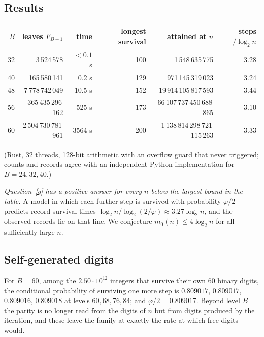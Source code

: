 \documentclass[11pt]{article}
\newcommand{\toprule}{\hline}\newcommand{\midrule}{\hline}\newcommand{\bottomrule}{\hline}
\begin{document}
\subsection*{Results}
\begin{center}
\begin{tabular}{rrrrrr}
\toprule
$B$ & leaves $F_{B+1}$ & time & longest survival & attained at $n$ & steps$/\log_2 n$\\
\midrule
32 & 3\,524\,578 & $<0.1$ s & 100 & 1\,548\,635\,775 & 3.28\\
40 & 165\,580\,141 & 0.2 s & 129 & 971\,145\,319\,023 & 3.24\\
48 & 7\,778\,742\,049 & 10.5 s & 152 & 19\,914\,105\,817\,593 & 3.44\\
56 & 365\,435\,296\,162 & 525 s & 173 & 66\,107\,737\,450\,688\,865 & 3.10\\
60 & 2\,504\,730\,781\,961 & 3564 s & 200 & 1\,138\,814\,298\,721\,115\,263 & 3.33\\
\bottomrule
\end{tabular}
\end{center}
(Rust, 32 threads, 128-bit arithmetic with an overflow guard that never triggered; counts and records agree with an
independent Python implementation for $B=24,32,40$.)

\emph{Question~\ref{q} has a positive answer for every $n$ below the largest bound in the table.} A model in which
each further step is survived with probability $\varphi/2$ predicts record survival times
$\log_2 n/\log_2(2/\varphi)\approx3.27\log_2 n$, and the observed records lie on that line. We conjecture
$m_0(n)\le4\log_2 n$ for all sufficiently large $n$.

\subsection*{Self-generated digits}
For $B=60$, among the $2.50\cdot10^{12}$ integers that survive their own $60$ binary digits, the conditional
probability of surviving one more step is $0.809017$, $0.809017$, $0.809016$, $0.809018$ at levels $60,68,76,84$;
and $\varphi/2=0.809017$. Beyond level $B$ the parity is no longer read from the digits of $n$ but from digits
produced by the iteration, and these leave the family at exactly the rate at which free digits would.
\end{document}
